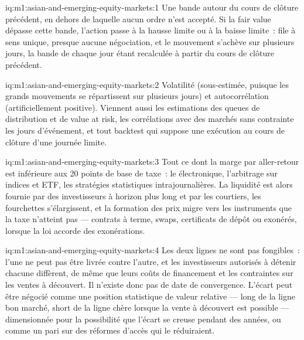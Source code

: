 \begin{solution}{iq:m1:asian-and-emerging-equity-markets:1}
Une bande autour du cours de clôture précédent, en dehors de laquelle aucun ordre n'est accepté. Si la fair value
dépasse cette bande, l'action passe à la hausse limite ou à la baisse limite~: file à sens unique,
presque aucune négociation, et le mouvement s'achève sur plusieurs jours, la bande de chaque jour
étant recalculée à partir du cours de clôture précédent.
\end{solution}

\begin{solution}{iq:m1:asian-and-emerging-equity-markets:2}
Volatilité (sous-estimée, puisque les grands mouvements se répartissent sur plusieurs jours) et
autocorrélation (artificiellement positive). Viennent aussi les estimations des queues de distribution et de value at risk,
les corrélations avec des marchés sans contrainte les jours d'événement, et tout backtest
qui suppose une exécution au cours de clôture d'une journée limite.
\end{solution}

\begin{solution}{iq:m1:asian-and-emerging-equity-markets:3}
Tout ce dont la marge par aller-retour est inférieure aux 20 points de base de taxe~:
le  électronique, l'arbitrage sur indices et ETF, les stratégies statistiques
intrajournalières. La liquidité est alors fournie par des investisseurs à horizon plus long et par
les courtiers, les fourchettes s'élargissent, et la formation des prix migre vers les instruments
que la taxe n'atteint pas --- contrats à terme, swaps, certificats de dépôt ou 
exonérés, lorsque la loi accorde des exonérations.
\end{solution}

\begin{solution}{iq:m1:asian-and-emerging-equity-markets:4}
Les deux lignes ne sont pas fongibles~: l'une ne peut pas être livrée contre l'autre,
et les investisseurs autorisés à détenir chacune diffèrent, de même que leurs coûts de financement et
les contraintes sur les ventes à découvert. Il n'existe donc pas de date de convergence. L'écart
peut être négocié comme une position statistique de valeur relative --- long de la ligne bon marché, short de la ligne chère
lorsque la vente à découvert est possible --- dimensionnée pour la possibilité que l'écart se creuse
pendant des années, ou comme un pari sur des réformes d'accès qui le réduiraient.
\end{solution}

